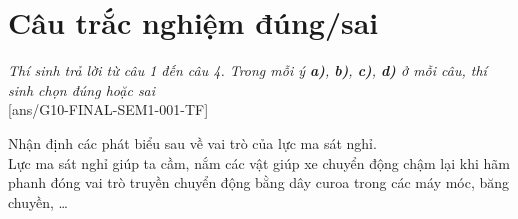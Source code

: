 \section{Câu trắc nghiệm đúng/sai} 
\textit{Thí sinh trả lời từ câu 1 đến câu 4. Trong mỗi ý \textbf{a)}, \textbf{b)}, \textbf{c)}, \textbf{d)} ở mỗi câu, thí sinh chọn đúng hoặc sai}
\setcounter{ex}{0}\\
[ans/G10-FINAL-SEM1-001-TF]
\begin{ex}
	Nhận định các phát biểu sau về vai trò của lực ma sát nghỉ.\\
	Lực ma sát nghỉ
	{\True giúp ta cầm, nắm các vật}
	{giúp xe chuyển động chậm lại khi hãm phanh}
	{\True đóng vai trò truyền chuyển động bằng dây curoa trong các máy móc, băng chuyền, \dots}
	\loigiai{}
\end{ex}
